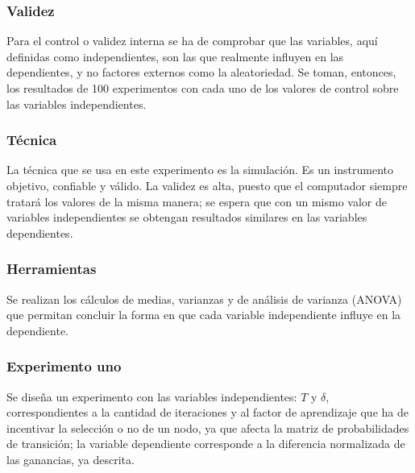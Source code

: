 \subsubsection{Validez}
Para el control o validez interna se ha de comprobar que las variables, aquí definidas como independientes, son las que realmente influyen en las dependientes, y no factores externos como la aleatoriedad. Se toman, entonces, los resultados de 100 experimentos con cada uno de los valores de control sobre las variables independientes.

\subsubsection{Técnica}
La técnica que se usa en este experimento es la simulación. Es un instrumento objetivo, confiable y válido. La validez es alta, puesto que el computador siempre tratará los valores de la misma manera; se espera que con un mismo valor de variables independientes se obtengan resultados similares en las variables dependientes.

\subsubsection{Herramientas}
Se realizan los cálculos de medias, varianzas y de análisis de varianza (ANOVA) que permitan concluir la forma en que cada variable independiente influye en la dependiente.

\subsubsection{Experimento uno}

Se diseña un experimento con las variables independientes: $T$ y $\delta$, correspondientes a la cantidad de iteraciones y al factor de aprendizaje que ha de incentivar la selección o no de un nodo, ya que afecta la matriz de probabilidades de transición; la variable dependiente corresponde a la diferencia normalizada de las ganancias, ya descrita.


